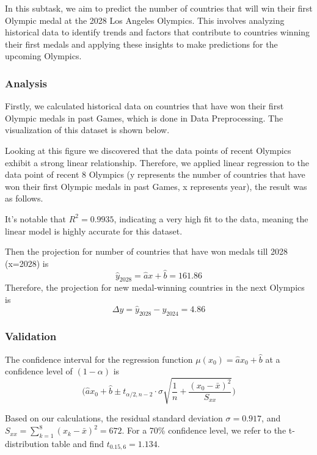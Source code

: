 \documentclass{mcmthesis}
\begin{document}
In this subtask, we aim to predict the number of countries that will win their first Olympic medal at the 2028 Los Angeles Olympics. This involves analyzing historical data to identify trends and factors that contribute to countries winning their first medals and applying these insights to make predictions for the upcoming Olympics.

\subsubsection{Analysis}
Firstly, we calculated historical data on countries that have won their first Olympic medals in past Games, which is done in Data Preprocessing. The visualization of this dataset is shown below.


Looking at this figure we discovered that the data points of recent Olympics exhibit a strong linear relationship. Therefore, we applied linear regression to the data point of recent 8 Olympics (y represents the number of countries that have won their first Olympic medals in past Games, x represents year), the result was as follows.


It's notable that $R^2=0.9935$, indicating a very high fit to the data, meaning the linear model is highly accurate for this dataset.

Then the projection for number of countries that have won medals till 2028 (x=2028) is
$$\hat{y}_{2028}=\hat{a}x+\hat{b}=161.86$$
Therefore, the projection for new medal-winning countries in the next Olympics is
$$\Delta y=\hat{y}_{2028}-y_{2024}=4.86$$

\subsubsection{Validation}
\begin{Theorem}
    The confidence interval for the regression function $\mu (x_0)=\hat{a}x_0+\hat{b}$ at a confidence level of $(1-\alpha)$ is
    $$\bigg( \hat{a}x_0+\hat{b} \pm t_{\alpha /2,n-2}\cdot \sigma \sqrt{\frac{1}{n}+\frac{(x_0-\bar{x})^2}{S_{xx}}} \bigg)$$
\end{Theorem}

Based on our calculations, the residual standard deviation $\sigma = 0.917$, and $S_{xx} = \sum_{k=1}^{8}(x_k - \bar{x})^2 = 672$. For a 70\% confidence level, we refer to the t-distribution table and find $t_{0.15,6} = 1.134$.
\end{document}

